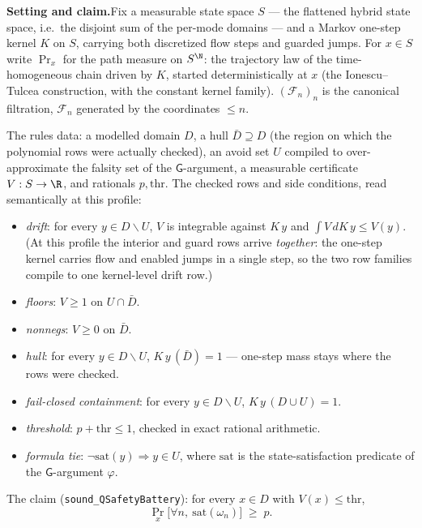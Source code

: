 

\textbf{Setting and claim.}\enspace Fix a measurable state space $S$ ---
the flattened hybrid state space, i.e.\ the disjoint sum of the per-mode
domains --- and a Markov one-step kernel $K$ on $S$, carrying both
discretized flow steps and guarded jumps. For $x \in S$ write $\Pr_x$
for the path measure on $S^{\N}$: the trajectory law of the
time-homogeneous chain driven by $K$, started deterministically at $x$
(the Ionescu--Tulcea construction, with the constant kernel family).
$(\mathcal{F}_n)_n$ is the canonical filtration, $\mathcal{F}_n$
generated by the coordinates $\le n$.

The rule\textquotesingle s data: a modelled domain $D$, a hull
$\bar{D} \supseteq D$ (the region on which the polynomial rows were
actually checked), an avoid set $U$ compiled to over-approximate the
falsity set of the $\mathsf{G}$-argument, a measurable certificate
$V : S \to \R$, and rationals $p, \mathrm{thr}$. The checked rows and
side conditions, read semantically at this profile:
\begin{itemize}
\item[(B1$\wedge$B2)] \emph{drift}: for every $y \in D \smallsetminus U$,
  $V$ is integrable against $K\,y$ and $\int V \,dK\,y \le V(y)$. (At
  this profile the interior and guard rows arrive \emph{together}: the
  one-step kernel carries flow and enabled jumps in a single step, so
  the two row families compile to one kernel-level drift row.)
\item[(B3)] \emph{floors}: $V \ge 1$ on $U \cap \bar{D}$.
\item[(B4)] \emph{nonnegs}: $V \ge 0$ on $\bar{D}$.
\item[(R3)] \emph{hull}: for every $y \in D \smallsetminus U$,
  $K\,y\,(\bar{D}) = 1$ --- one-step mass stays where the rows were
  checked.
\item[(R4)] \emph{fail-closed containment}: for every
  $y \in D \smallsetminus U$, $K\,y\,(D \cup U) = 1$.
\item[($\Theta$)] \emph{threshold}: $p + \mathrm{thr} \le 1$, checked in
  exact rational arithmetic.
\item[(F)] \emph{formula tie}: $\lnot \mathrm{sat}(y) \Rightarrow y \in U$,
  where $\mathrm{sat}$ is the state-satisfaction predicate of the
  $\mathsf{G}$-argument $\varphi$.
\end{itemize}
The claim (\texttt{sound\_QSafetyBattery}): for every $x \in D$ with
$V(x) \le \mathrm{thr}$,
\[
\Pr_x\bigl[\forall n,\ \mathrm{sat}(\omega_n)\bigr] \;\ge\; p .
\]

